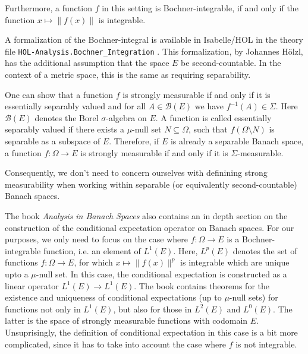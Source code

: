 Furthermore, a function $f$ in this setting is Bochner-integrable, if and only if the function $x \mapsto \lVert f(x) \rVert$ is integrable.

\vspace{0.3cm}

A formalization of the Bochner-integral is available in Isabelle/HOL in the theory file \texttt{HOL-Analysis.Bochner\_Integration} \cite{hoelzl2011measuretheory}. This formalization, by Johannes Hölzl, has the additional assumption that the space $E$ be second-countable. In the context of a metric space, this is the same as requiring separability.
\vspace{0.3cm}
\begin{remark}

One can show that a function $f$ is strongly measurable if and only if it is essentially separably valued and for all $A \in \mathcal{B}(E)$ we have $f^{-1}(A) \in \Sigma$. Here $\mathcal{B}(E)$ denotes the Borel $\sigma$-algebra on $E$. A function is called essentially separably valued if there exists a $\mu$-null set $N \subseteq \Omega$, such that $f (\Omega \setminus N)$ is separable as a subspace of $E$. Therefore, if $E$ is already a separable Banach space, a function $f : \Omega \rightarrow E$ is strongly measurable if and only if it is $\Sigma$-measurable.

Consequently, we don't need to concern ourselves with definining strong measurability when working within separable (or equivalently second-countable) Banach spaces.
\end{remark}
\vspace{0.3cm}

The book \textit{Analysis in Banach Spaces} also contains an in depth section on the construction of the conditional expectation operator on Banach spaces. For our purposes, we only need to focus on the case where $f : \Omega \rightarrow E$ is a Bochner-integrable function, i.e. an element of $L^1(E)$. Here, $L^p(E)$ denotes the set of functions $f: \Omega \rightarrow E$, for which $x \mapsto \lVert f(x) \rVert^p$ is integrable which are unique upto a $\mu$-null set. In this case, the conditional expectation is constructed as a linear operator $L^1(E) \rightarrow L^1(E)$. The book contains theorems for the existence and uniqueness of conditional expectations (up to $\mu$-null sets) for functions not only in $L^1(E)$, but also for those in $L^2(E)$ and $L^0(E)$. The latter is the space of strongly measurable functions with codomain $E$. Unsuprisingly, the definition of conditional expectation in this case is a bit more complicated, since it has to take into account the case where $f$ is not integrable.

